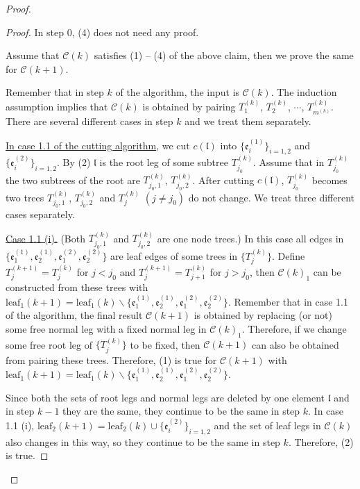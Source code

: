 \begin{proof}
\begin{proof}
In step $0$, (4) does not need any proof.

\medskip

Assume that $\mathcal{C}(k)$ satisfies (1) -- (4) of the above claim, then we prove the same for $\mathcal{C}(k+1)$.

Remember that in step $k$ of the algorithm, the input is $\mathcal{C}(k)$. The induction assumption implies that $\mathcal{C}(k)$ is obtained by pairing $T^{(k)}_1$, $T^{(k)}_2$, $\cdots$, $T^{(k)}_{m^{(k)}}$. There are several different cases in step $k$ and we treat them separately.

\underline{In case 1.1 of the cutting algorithm}, we cut $c(\mathfrak{l})$ into $\{\mathfrak{e}_{i}^{(1)}\}_{i=1,2}$ and $\{\mathfrak{e}_{i}^{(2)}\}_{i=1,2}$. By (2) $\mathfrak{l}$ is the root leg of some subtree $T^{(k)}_{j_0}$. Assume that in $T^{(k)}_{j_0}$ the two subtrees of the root are $T^{(k)}_{j_0,1}$, $T^{(k)}_{j_0,2}$. After cutting $c(\mathfrak{l})$, $T^{(k)}_{j_0}$ becomes two trees $T^{(k)}_{j_0,1}$, $T^{(k)}_{j_0,2}$ and $T^{(k)}_{j}$ $(j\ne j_0)$ do not change. We treat three different cases separately.

\underline{Case 1.1 (i).} (Both $T^{(k)}_{j_0,1}$ and $T^{(k)}_{j_0,2}$ are one node trees.) In this case all edges in $\{\mathfrak{e}_{1}^{(1)}, \mathfrak{e}_{2}^{(1)}, \mathfrak{e}_{1}^{(2)}, \mathfrak{e}_{2}^{(2)}\}$ are leaf edges of some trees in $\{T_{j}^{(k)}\}$. Define $T^{(k+1)}_{j}=T^{(k)}_{j}$ for $j< j_0$ and $T^{(k+1)}_{j}=T^{(k)}_{j+1}$ for $j> j_0$, then $\mathcal{C}(k)_1$ can be constructed from these trees with $\text{leaf}_1(k+1)=\text{leaf}_1(k)\backslash\{\mathfrak{e}_{1}^{(1)}, \mathfrak{e}_{2}^{(1)}, \mathfrak{e}_{1}^{(2)}, \mathfrak{e}_{2}^{(2)}\}$. Remember that in case 1.1 of the algorithm, the final result $\mathcal{C}(k+1)$ is obtained by replacing (or not) some free normal leg with a fixed normal leg in $\mathcal{C}(k)_1$. Therefore, if we change some free root leg of $\{T^{(k)}_{j}\}$ to be fixed, then $\mathcal{C}(k+1)$ can also be obtained from pairing these trees. Therefore, (1) is true for $\mathcal{C}(k+1)$ with $\text{leaf}_1(k+1)=\text{leaf}_1(k)\backslash\{\mathfrak{e}_{1}^{(1)}, \mathfrak{e}_{2}^{(1)}, \mathfrak{e}_{1}^{(2)}, \mathfrak{e}_{2}^{(2)}\}$.

Since both the sets of root legs and normal legs are deleted by one element $\mathfrak{l}$ and in step $k-1$ they are the same, they continue to be the same in step $k$. In case 1.1 (i), $\text{leaf}_2(k+1)=\text{leaf}_2(k)\cup \{\mathfrak{e}_{i}^{(2)}\}_{i=1,2}$ and the set of leaf legs in $\mathcal{C}(k)$ also changes in this way, so they continue to be the same in step $k$. Therefore, (2) is true.


\end{proof}
\end{proof}

